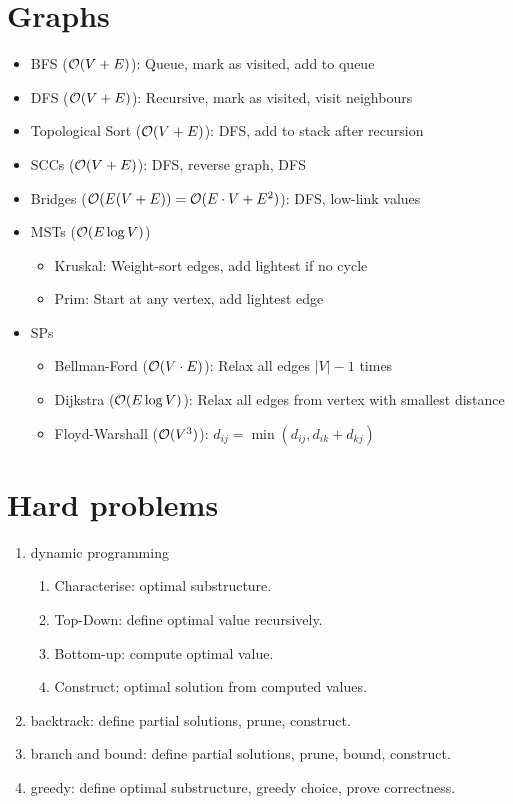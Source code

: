 \documentclass{article}
\begin{document}
\section{Graphs}
\begin{itemize}
  \item BFS ($\mathcal{O}(V+E)$): Queue, mark as visited, add to queue
  \item DFS ($\mathcal{O}(V+E)$): Recursive, mark as visited, visit neighbours
  \item Topological Sort ($\mathcal{O}(V+E)$): DFS, add to stack after recursion
  \item SCCs ($\mathcal{O}(V+E)$): DFS, reverse graph, DFS
  \item Bridges ($\mathcal{O}(E(V+E))=\mathcal{O}(E\cdot V+E^2)$): DFS, low-link values
  \item MSTs ($\mathcal{O}(E\log V)$) \begin{itemize}
          \item Kruskal: Weight-sort edges, add lightest if no cycle
          \item Prim: Start at any vertex, add lightest edge
        \end{itemize}
  \item SPs \begin{itemize}
          \item Bellman-Ford ($\mathcal{O}(V\cdot E)$): Relax all edges $|V|-1$ times
          \item Dijkstra ($\mathcal{O}(E\log V)$): Relax all edges from vertex with smallest distance
          \item Floyd-Warshall ($\mathcal{O}(V^3)$): $d_{ij} = \min(d_{ij},d_{ik}+d_{kj})$
        \end{itemize}
\end{itemize}

\section{Hard problems}
\begin{enumerate}
  \item dynamic programming \begin{enumerate}
          \item Characterise: optimal substructure.
          \item Top-Down: define optimal value recursively.
          \item Bottom-up: compute optimal value.
          \item Construct: optimal solution from computed values.
        \end{enumerate}
  \item backtrack: define partial solutions, prune, construct.
  \item branch and bound: define partial solutions, prune, bound, construct.
  \item greedy: define optimal substructure, greedy choice, prove correctness.
\end{enumerate}
\end{document}
